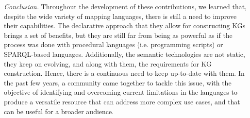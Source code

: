 \begin{itemize}
    \textit{Conclusion.} Throughout the development of these contributions, we learned that, despite the wide variety of mapping languages, there is still a need to improve their capabilities. The declarative approach that they allow for constructing KGs brings a set of benefits, but they are still far from being as powerful as if the process was done with procedural languages (i.e. programming scripts) or SPARQL-based languages. Additionally, the semantic technologies are not static, they keep on evolving, and along with them, the requirements for KG construction. Hence, there is a continuous need to keep up-to-date  with them. In the past few years, a community came together to tackle this issue, with the objective of identifying and overcoming current limitations in the languages to produce a versatile resource that can address more complex use cases, and that can be useful for a broader audience. %
\end{itemize}





